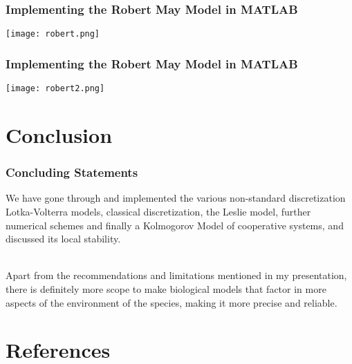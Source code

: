 \documentclass[xcolor={svgnames},hyperref={colorlinks,allcolors=Blue}]{beamer}
\begin{document}
\begin{frame}
\frametitle{Implementing the Robert May Model in MATLAB}

	\begin{center}
		\texttt{[image: robert.png]}
	\end{center}

\end{frame}

\begin{frame}
\frametitle{Implementing the Robert May Model in MATLAB}

	\begin{center}
		\texttt{[image: robert2.png]}
	\end{center}

\end{frame}


\section{Conclusion}

\begin{frame}
\frametitle{Concluding Statements}

We have gone through and implemented the various non-standard discretization Lotka-Volterra models, classical discretization, the Leslie model, further numerical schemes and finally a Kolmogorov Model of cooperative systems, and discussed its local stability. 

\pause
~\\ Apart from the recommendations and limitations mentioned in my presentation, there is definitely more scope to make biological models that factor in more aspects of the environment of the species, making it more precise and reliable.

\end{frame}


\section{References}
\end{document}
